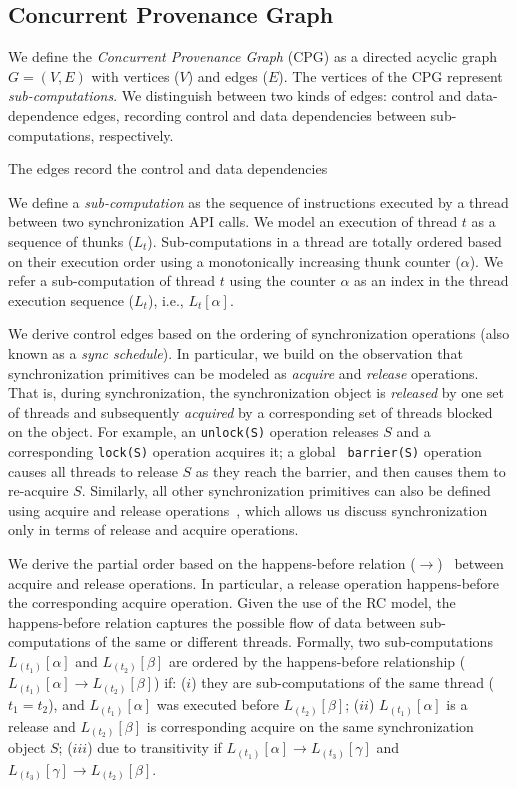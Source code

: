 


\subsection{Concurrent Provenance Graph}  We define the {\em
Concurrent Provenance Graph} (CPG)  as a directed acyclic graph $G =
(V,E)$ with vertices ($V$) and edges ($E$). The
vertices of the CPG represent {\em sub-computations}. We distinguish between two kinds of edges: control and data-dependence edges, recording control and data dependencies between sub-computations, respectively. 

The edges  record the control and data dependencies 

 We define a {\em sub-computation}  as the sequence of instructions
executed by a thread between two \pthreads synchronization API calls. We model an execution of thread $t$ as a sequence of thunks
($L_t$). Sub-computations in a thread are totally ordered based on their execution order
using a monotonically increasing thunk counter ($\alpha$). We refer a sub-computation of thread $t$ using the counter $\alpha$ as an index in the thread execution sequence ($L_t$), i.e., $L_t[\alpha]$. 

 We derive control edges based on the ordering of synchronization operations (also known as a {\em sync schedule}). In particular,  we build on the observation that synchronization primitives can be modeled as {\em acquire} and {\em release} operations. That is,   during synchronization, the synchronization object is {\em released} by one set of threads and subsequently  {\em acquired} by a corresponding set of threads blocked on the object. For example, an {\tt unlock(S)} operation releases $S$
and a corresponding {\tt lock(S)} operation acquires it; a global {\tt
barrier(S)} operation causes all threads to release $S$ as they reach the
barrier, and then causes them to re-acquire $S$. Similarly, all other
synchronization primitives can also be defined using acquire and release
operations~\cite{djit, fast-track-pldi}, which allows us discuss synchronization only in terms of release and acquire operations.


We derive the partial order based on the happens-before relation
($\rightarrow$)~\cite{djit,fast-track-pldi} between acquire and release operations. In particular, a release
operation happens-before the corresponding acquire operation. Given
the use of the RC model, the happens-before relation
captures the possible flow of data between sub-computations of the same or different threads.
Formally, two sub-computations $L_{(t_1)}[\alpha]$ and
$L_{(t_2)}[\beta]$ are ordered by the happens-before relationship ($L_{(t_1)}[\alpha] \rightarrow
L_{(t_2)}[\beta]$) if:  ($i$)  they are sub-computations of the
same thread ($t_1 = t_2$), and $L_{(t_1)}[\alpha]$ was executed before $L_{(t_2)}[\beta]$; ($ii$)  $L_{(t_1)}[\alpha]$  is a release and $L_{(t_2)}[\beta]$ is corresponding acquire on the same synchronization object $S$; ($iii$) due to transitivity if  
 $L_{(t_1)}[\alpha] \rightarrow L_{(t_3)}[\gamma] $ and $L_{(t_3)}[\gamma]  \rightarrow L_{(t_2)}[\beta]$.


